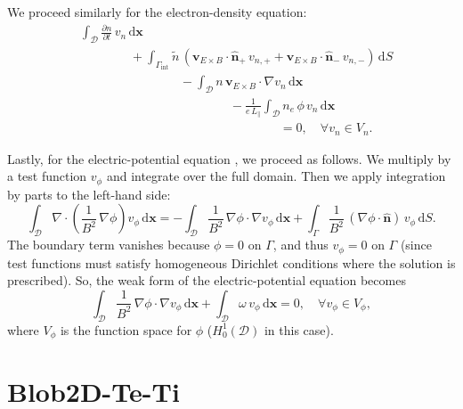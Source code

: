 \documentclass[12pt]{article}
\begin{document}
We proceed similarly for the electron-density equation:
%
\begin{equation}
    \begin{aligned}
        & \int_\mathcal{D} \frac{\partial n}{\partial t} \, v_n \, \mathrm{d}\bm{x} \\
        & \hspace{4em} + \int_{\Gamma_\text{int}} \tilde{n} \, ( \bm{v}_{E \times B} \cdot \hat{\bm{n}}_+ \, v_{n,+} + \bm{v}_{E \times B} \cdot \hat{\bm{n}}_- \, v_{n,-} ) \, \mathrm{d}S \\
        & \hspace{8em} - \int_\mathcal{D} n \, \bm{v}_{E \times B} \cdot \nabla v_n \, \mathrm{d}\bm{x} \\
        & \hspace{12em} - \frac{1}{e \, L_\parallel} \int_\mathcal{D} n_e \, \phi \, v_n \, \mathrm{d}\bm{x} \\
        & \hspace{16em} = 0 , \quad \forall v_n \in V_n .
    \end{aligned}
\end{equation}

Lastly, for the electric-potential equation , we proceed as follows. We multiply by a test function $v_\phi$ and integrate over the full domain. Then we apply integration by parts to the left-hand side:
%
\begin{equation}
    \int_\mathcal{D} \nabla \cdot \left( \frac{1}{B^2} \, \nabla \phi \right) v_\phi \, \mathrm{d}\bm{x} = - \int_\mathcal{D} \frac{1}{B^2} \, \nabla \phi \cdot \nabla v_\phi \, \mathrm{d}\bm{x} + \int_\Gamma \frac{1}{B^2} \, (\nabla \phi \cdot \hat{\bm{n}}) \, v_\phi \, \mathrm{d}S.
\end{equation}
%
The boundary term vanishes because $\phi = 0$ on $\Gamma$, and thus $v_\phi = 0$ on $\Gamma$ (since test functions must satisfy homogeneous Dirichlet conditions where the solution is prescribed). So, the weak form of the electric-potential equation becomes
%
\begin{equation}
    \int_\mathcal{D} \frac{1}{B^2} \, \nabla \phi \cdot \nabla v_\phi \, \mathrm{d}\bm{x} + \int_\mathcal{D} \omega \, v_\phi \, \mathrm{d}\bm{x} = 0, \quad \forall v_\phi \in V_\phi,
\end{equation}
%
where $V_\phi$ is the function space for $\phi$ ($H_0^1(\mathcal{D})$ in this case).

\newpage

\section{Blob2D-Te-Ti}
\end{document}
